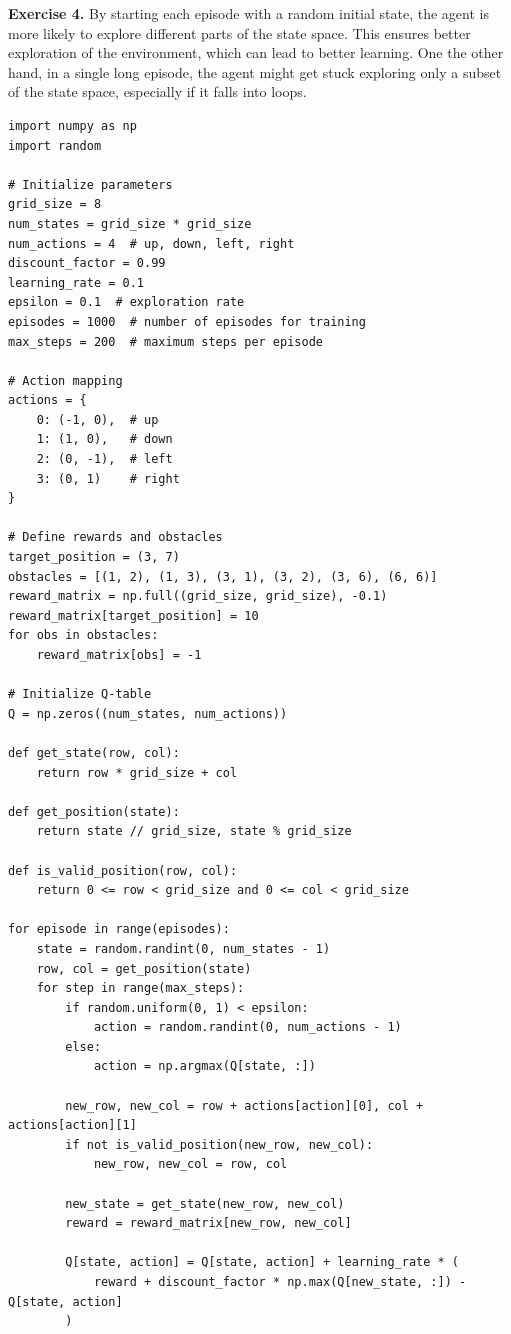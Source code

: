 \documentclass[letter,11pt]{article}
\begin{document}
\textbf{Exercise 4.}
By starting each episode with a random initial state, the agent is more likely to explore different parts of the state space. This ensures better exploration of the environment, which can lead to better learning. One the other hand, in a single long episode, the agent might get stuck exploring only a subset of the state space, especially if it falls into loops. 
\begin{lstlisting}
import numpy as np
import random

# Initialize parameters
grid_size = 8
num_states = grid_size * grid_size
num_actions = 4  # up, down, left, right
discount_factor = 0.99
learning_rate = 0.1
epsilon = 0.1  # exploration rate
episodes = 1000  # number of episodes for training
max_steps = 200  # maximum steps per episode

# Action mapping
actions = {
    0: (-1, 0),  # up
    1: (1, 0),   # down
    2: (0, -1),  # left
    3: (0, 1)    # right
}

# Define rewards and obstacles
target_position = (3, 7)
obstacles = [(1, 2), (1, 3), (3, 1), (3, 2), (3, 6), (6, 6)]
reward_matrix = np.full((grid_size, grid_size), -0.1)
reward_matrix[target_position] = 10
for obs in obstacles:
    reward_matrix[obs] = -1

# Initialize Q-table
Q = np.zeros((num_states, num_actions))

def get_state(row, col):
    return row * grid_size + col

def get_position(state):
    return state // grid_size, state % grid_size

def is_valid_position(row, col):
    return 0 <= row < grid_size and 0 <= col < grid_size

for episode in range(episodes):
    state = random.randint(0, num_states - 1)
    row, col = get_position(state)
    for step in range(max_steps):
        if random.uniform(0, 1) < epsilon:
            action = random.randint(0, num_actions - 1)
        else:
            action = np.argmax(Q[state, :])
        
        new_row, new_col = row + actions[action][0], col + actions[action][1]
        if not is_valid_position(new_row, new_col):
            new_row, new_col = row, col
        
        new_state = get_state(new_row, new_col)
        reward = reward_matrix[new_row, new_col]
        
        Q[state, action] = Q[state, action] + learning_rate * (
            reward + discount_factor * np.max(Q[new_state, :]) - Q[state, action]
        )
        

\end{lstlisting}
\end{document}
